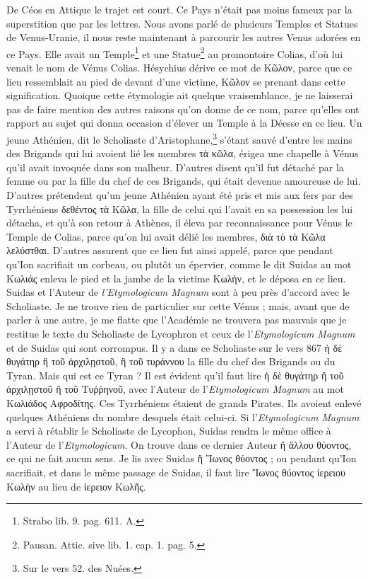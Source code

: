 \documentclass[a4paper, 18pt, oneside]{article}
\begin{document}
De Céos en Attique le trajet est court. Ce Pays n'était pas moins fameux par la superstition que par les lettres. Nous avons parlé de plusieurs Temples et Statues de Venus-Uranie, il nous reste maintenant à parcourir les autres Venus adorées en ce Pays. Elle avait un Temple\footnote{Strabo lib. 9. pag. 611. A.} et une Statue\footnote{Pausan. Attic. sive lib. 1. cap. 1. pag. 5.} au promontoire Colias, d'où lui venait le nom de Vénus Colias. Hésychius dérive ce mot de Κῶλον, parce que ce lieu ressemblait au pied de devant d'une victime, Κῶλον se prenant dans cette signification. Quoique cette étymologie ait quelque vraisemblance, je ne laisserai pas de faire mention des autres raisons qu'on donne de ce nom, parce qu'elles ont rapport au sujet qui donna occasion d'élever un Temple à la Déesse en ce lieu. Un jeune Athénien, dit le Scholiaste d'Aristophane,\footnote{Sur le vers 52. des Nuées.} s'étant sauvé d'entre les mains des Brigands qui lui avoient lié les membres τὰ κῶλα, érigea une chapelle à Vénus qu'il avait invoquée dans son malheur. D'autres disent qu'il fut détaché par la femme ou par la fille du chef de ces Brigands, qui était devenue amoureuse de lui. D'autres prétendent qu'un jeune Athénien ayant été pris et mis aux fers par des Tyrrhéniens δεθέντος τὰ Κῶλα, la fille de celui qui l'avait en sa possession les lui détacha, et qu'à son retour à Athènes, il éleva par reconnaissance pour Vénus le Temple de Colias, parce qu'on lui avait délié les membres, διὰ τὸ τὰ Κῶλα λελύστθαι. D'autres assurent que ce lieu fut ainsi appelé, parce que pendant qu'Ion sacrifiait un corbeau, ou plutôt un épervier, comme le dit Suidas au mot Κωλιάς enleva le pied et la jambe de la victime Κωλήν, et le déposa en ce lieu. Suidas et l'Auteur de \emph{l'Etymologicum Magnum} sont à peu près d'accord avec le Scholiaste. Je ne trouve rien de particulier sur cette Vénus ; mais, avant que de parler à une autre, je me flatte que l'Académie ne trouvera pas mauvais que je restitue le texte du Scholiaste de Lycophron et ceux de l'\emph{Etymologicum Magnum} et de Suidas qui sont corrompus. Il y a dans ce Scholiaste sur le vers 867 ἡ δὲ θυγάτηρ ἢ τοῦ ἀρχιλῃστοῦ, ἢ τοῦ τυράννου la fille du chef des Brigands ou du Tyran. Mais qui est ce Tyran ? Il est évident qu'il faut lire ἡ δὲ θυγάτηρ ἢ τοῦ ἀρχιλῃστοῦ ἢ τοῦ Τυῤῥηνοῦ, avec l'Auteur de l'\emph{Etymologicum Magnum} au mot Κωλιάδος Αφροδίτης. Ces Tyrrhéniens étaient de grands Pirates. Ils avoient enlevé quelques Athéniens du nombre desquels était celui-ci. Si l'\emph{Etymologicum Magnum} a servi à rétablir le Scholiaste de Lycophon, Suidas rendra le même office à l'Auteur de l'\emph{Etymologicum}. On trouve dans ce dernier Auteur ἢ ἄλλου θύοντος, ce qui ne fait aucun sens. Je lis avec Suidas ἢ Ἲωνος θύοντος ; ou pendant qu'Ion sacrifiait, et dans le même passage de Suidas, il faut lire Ἲωνος θύοντος ἰερειου Κωλὴν au lieu de ἰερειον Κωλῆς.
\end{document}
